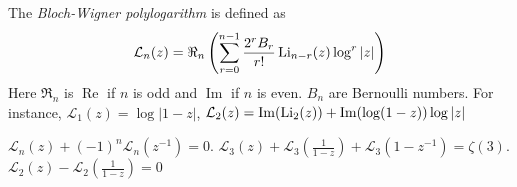 \documentclass[main]{subfiles}
\begin{document}
\begin{definition}
The \textit{Bloch-Wigner polylogarithm} is defined as
\[\mathcal L_n(z)=\Re_n\left(\sum_{r=0}^{n-1}\frac{2^rB_r}{r!}\operatorname{Li}_{n-r}(z)\log^r|z|\right)\]
Here $\Re_n$ is $\operatorname{Re}$ if $n$ is odd and $\operatorname{Im}$ if $n$ is even. $B_n$ are Bernoulli numbers. For instance, $\mathcal L_1(z)=\log|1-z|$, $\mathcal L_2(z)=\operatorname{Im}(\operatorname{Li}_2(z))+\operatorname{Im}(\log(1-z))\log|z|$
\end{definition}

\begin{lemma}
$\mathcal L_n(z)+(-1)^n\mathcal L_n(z^{-1})=0$. $\mathcal L_3(z)+\mathcal L_3\left(\frac{1}{1-z}\right)+\mathcal L_3(1-z^{-1})=\zeta(3)$. $\mathcal L_2(z)-\mathcal L_2\left(\frac{1}{1-z}\right)=0$
\end{lemma}
\end{document}
